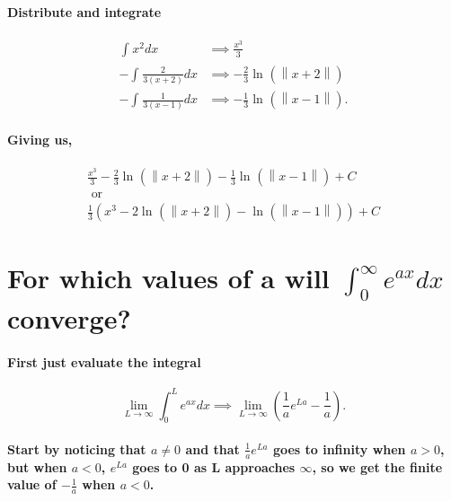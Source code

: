 \documentclass[a4paper]{article}
\begin{document}
\paragraph{Distribute and integrate}
\begin{align*}
  \int_{}^{} x^2dx &\implies \frac{x^3}{3} \\
  -\int_{}^{} \frac{2}{3\left( x+2 \right) }dx&\implies -\frac{2}{3}\ln^{}( \left\| x+2 \right\| )\\
  -\int_{}^{} \frac{1}{3\left( x-1 \right) }dx&\implies -\frac{1}{3}\ln^{}( \left\| x-1 \right\| )
.\end{align*}
\paragraph{Giving us,}

\begin{gather*}
  \frac{x^3}{3} -\frac{2}{3}\ln^{}( \left\| x+2 \right\| ) -\frac{1}{3}\ln^{}( \left\| x-1 \right\| )+C \\
  \text{ or }\\
  \frac{1}{3}\left( x^3-2\ln^{}( \left\| x+2 \right\| )-\ln^{}( \left\| x-1 \right\| ) \right) +C
\end{gather*}
\newpage
\section{For which values of a will $\int_{0}^{\infty} e^{ax}dx$ converge?}%
\paragraph{First just evaluate the integral}
\[
\lim_{L \to \infty} \int_{0}^{L} e^{ax}dx \implies \lim_{L \to \infty} \left( \frac{1}{a}e^{La} - \frac{1}{a}\right) 
.\] 
\paragraph{Start by noticing that $a\neq 0$ and that $\frac{1}{a}e^{La}$ goes to infinity when $a>0$, but when $a<0$, $e^{La}$ goes to 0 as L approaches $\infty$, so we get the finite value of $-\frac{1}{a}$ when $a<0$.}






\end{document}
